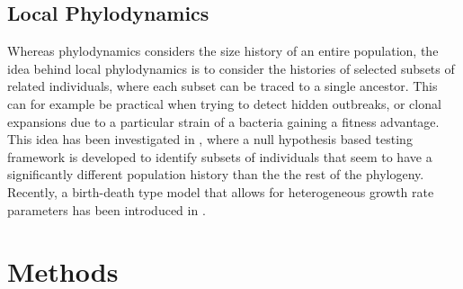 \documentclass{ieeeaccess}
\theoremstyle{definition}
\begin{document}
\subsection{Local Phylodynamics}
Whereas phylodynamics considers the size history of an entire population, the idea behind local phylodynamics is to consider the histories of selected subsets of related individuals, where each subset can be traced to a single ancestor. This can for example be practical when trying to detect hidden outbreaks, or clonal expansions due to a particular strain of a bacteria gaining a fitness advantage. This idea has been investigated in \cite{volz_identification_nodate}, where a null hypothesis based testing framework is developed to identify subsets of individuals that seem to have a significantly different population history than the the rest of the phylogeny. Recently, a birth-death type model that allows for heterogeneous growth rate parameters has been introduced in \cite{barido-sottani_multitype_2020}.
\section{Methods}
\end{document}
